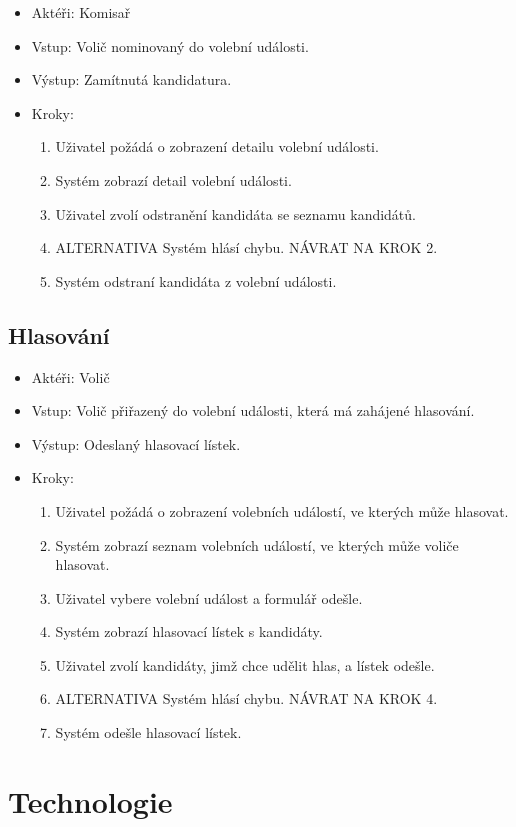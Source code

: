 \documentclass[11pt,twoside,a4paper]{book}
\begin{document}
\begin{itemize}
\item Aktéři: Komisař
\item Vstup: Volič nominovaný do volební události.
\item Výstup: Zamítnutá kandidatura.
\item Kroky:
	\begin{enumerate}
		\item Uživatel požádá o zobrazení detailu volební události.
		\item Systém zobrazí detail volební události.
		\item Uživatel zvolí odstranění kandidáta se seznamu kandidátů.		
		\item ALTERNATIVA Systém hlásí chybu. NÁVRAT NA KROK 2.
		\item Systém odstraní kandidáta z volební události.
	\end{enumerate}
\end{itemize}

\subsection{Hlasování}

\begin{itemize}
\item Aktéři: Volič
\item Vstup: Volič přiřazený do volební události, která má zahájené hlasování.
\item Výstup: Odeslaný hlasovací lístek.
\item Kroky:
	\begin{enumerate}
		\item Uživatel požádá o zobrazení volebních událostí, ve kterých může hlasovat.
		\item Systém zobrazí seznam volebních událostí, ve kterých může voliče hlasovat.
		\item Uživatel vybere volební událost a formulář odešle.
		\item Systém zobrazí hlasovací lístek s kandidáty.
		\item Uživatel zvolí kandidáty, jimž chce udělit hlas, a lístek odešle.	
		\item ALTERNATIVA Systém hlásí chybu. NÁVRAT NA KROK 4.
		\item Systém odešle hlasovací lístek.
	\end{enumerate}
\end{itemize}

\section{Technologie}
\end{document}
